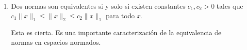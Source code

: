 \documentclass[12pt]{article}
\begin{document}
\begin{ejercicio}
\begin{enumerate}[label=(\alph*)]
        Esta es falsa. En cualquier espacio normado, la norma es de hecho lipschitziana con constante 1, y por tanto uniformemente continua. En particular, la desigualdad triangular inversa nos da que:
        \begin{align*}
            |\|x\| - \|y\|| \leq \|x - y\|\qquad \forall x, y \in X
        \end{align*}
        \item Dos normas son equivalentes si y solo si existen constantes $c_1, c_2 > 0$ tales que $c_1\|x\|_1 \leq \|x\|_2 \leq c_2\|x\|_1$ para todo $x$.
        
        Esta es cierta. Es una importante caracterización de la equivalencia de normas en espacios normados.
    \end{enumerate}
\end{ejercicio}
\end{document}
